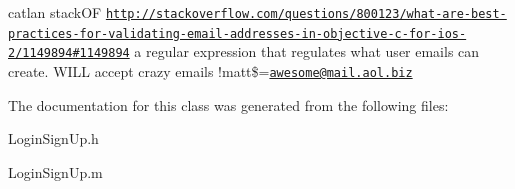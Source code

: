 catlan stack\+O\+F \href{http://stackoverflow.com/questions/800123/what-are-best-practices-for-validating-email-addresses-in-objective-c-for-ios-2/1149894#1149894}{\tt http\+://stackoverflow.\+com/questions/800123/what-\/are-\/best-\/practices-\/for-\/validating-\/email-\/addresses-\/in-\/objective-\/c-\/for-\/ios-\/2/1149894\#1149894} a regular expression that regulates what user emails can create. W\+I\+L\+L accept crazy emails !matt\$=\href{mailto:awesome@mail.aol.biz}{\tt awesome@mail.\+aol.\+biz} 

The documentation for this class was generated from the following files\+:\begin{DoxyCompactItemize}
\item 
Login\+Sign\+Up.\+h\item 
Login\+Sign\+Up.\+m\end{DoxyCompactItemize}
